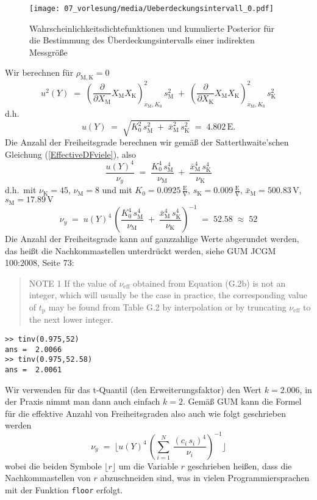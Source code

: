 \begin{figure}
\begin{center}
\texttt{[image: 07\_vorlesung/media/Ueberdeckungsintervall\_0.pdf]}
\caption{\label{VergleichsBeispiel}Wahrscheinlichkeitsdichtefunktionen und kumulierte Posterior
für die Bestimmung des Überdeckungsintervalls einer indirekten Messgröße}
\end{center}
\end{figure}
Wir berechnen für $\rho_{\mathrm{M}, \mathrm{K}} = 0$
$$
u^2(Y) \; = \;
\left(\frac{\partial}{\partial X_\mathrm{M}} X_\mathrm{M} X_\mathrm{K}
\right)^2_{\bar x_\mathrm{M}, K_0} \, s_\mathrm{M}^2 \; + \;
\left(\frac{\partial}{\partial X_\mathrm{K}} X_\mathrm{M} X_\mathrm{K}
\right)^2_{\bar x_\mathrm{M}, K_0} \, s_\mathrm{K}^2
$$
d.h.
$$
u(Y) \; = \;
\sqrt{ K_0^2 \, s_\mathrm{M}^2 \; + \; \bar x_\mathrm{M}^2 \, s_\mathrm{K}^2 }
\; = \; 4.802 \, \mathrm{E} .
$$
Die Anzahl der Freiheitsgrade berechnen wir gemäß der Satterthwaite'schen Gleichung
(\ref{EffectiveDFviele}), also
$$
\frac{u(Y)^4}{\nu_y} \; = \; \frac{K_0^4 \, s_\mathrm{M}^4}{\nu_\mathrm{M}} \; + \;
\frac{\bar x_\mathrm{M}^4 \, s_\mathrm{K}^4}{\nu_\mathrm{K}}
$$
d.h.\ mit $\nu_\mathrm{K} = 45$, $\nu_\mathrm{M} = 8$ und mit
$K_0 = 0.0925 \, \frac{\mathrm{E}}{\mathrm{V}}$, $s_\mathrm{K}=0.009 \, \frac{\mathrm{E}}{\mathrm{V}}$,
$\bar x_\mathrm{M} = 500.83 \, \mathrm{V}$, $s_\mathrm{M} = 17.89 \, \mathrm{V}$
$$
\nu_y \; = \; u(Y)^4 \, \left( \frac{K_0^4 \, s_\mathrm{M}^4}{\nu_\mathrm{M}} \; + \;
\frac{\bar x_\mathrm{M}^4 \, s_\mathrm{K}^4}{\nu_\mathrm{K}} \right)^{-1} \; = \;
52.58 \; \approx \; 52
$$
Die Anzahl der Freiheitsgrade kann auf ganzzahlige Werte abgerundet werden, das heißt die Nachkommastellen
 unterdrückt werden, siehe GUM JCGM 100:2008, Seite 73:
\begin{quote}
NOTE 1 If the value of $\nu_\mathrm{eff}$ obtained from Equation (G.2b) is not an integer,
which will usually be the case in practice, the corresponding value of $t_\mathrm{p}$ may be found
from Table G.2 by interpolation or by truncating $\nu_\mathrm{eff}$ to the next lower integer.
\end{quote}
\begin{lstlisting}[style=Matlab]
>> tinv(0.975,52)
ans =  2.0066
>> tinv(0.975,52.58)
ans =  2.0061
\end{lstlisting}
Wir verwenden für das t-Quantil (den Erweiterungsfaktor) den Wert $k = 2.006$, in der Praxis
nimmt man dann auch einfach $k = 2$.
Gemäß GUM kann die Formel für die effektive Anzahl von Freiheitsgraden also auch wie folgt
geschrieben werden
\begin{equation}
\nu_y \; = \;  \lfloor u(Y)^4 \, \left( \sum\limits_{i=1}^N \, \frac{ (c_i \, s_i)^4}{\nu_i}  \right)^{-1} \rfloor
\label{SatterthwaiteFloor}
\end{equation}
wobei die beiden Symbole $\lfloor r \rfloor$ um die Variable $r$ geschrieben heißen, dass
die Nachkommastellen von $r$ abzuschneiden sind, was in vielen Programmiersprachen mit der
Funktion \texttt{floor} erfolgt.

